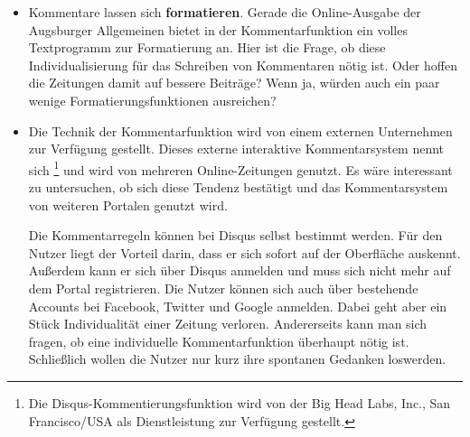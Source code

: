\begin{itemize}


\item Kommentare lassen sich {\bfseries formatieren}. Gerade die Online-Ausgabe der Augsburger Allgemeinen bietet in der Kommentarfunktion ein volles Textprogramm zur Formatierung an.  Hier ist die Frage, ob diese Individualisierung für das Schreiben von  Kommentaren nötig ist. Oder hoffen die Zeitungen damit auf bessere Beiträge? Wenn ja, würden auch ein paar wenige Formatierungsfunktionen ausreichen? \\

\item Die Technik der Kommentarfunktion wird von einem externen Unternehmen zur Verfügung gestellt. Dieses externe interaktive
Kommentarsystem nennt sich \grqq\footnote{Die Disqus-Kommentierungsfunktion wird von der Big Head Labs, Inc., San Francisco/USA als Dienstleistung zur Verfügung gestellt.} und wird von mehreren Online-Zeitungen genutzt. Es wäre interessant zu untersuchen, ob sich diese Tendenz bestätigt und das Kommentarsystem von weiteren Portalen genutzt wird. 

Die Kommentarregeln können bei Disqus selbst bestimmt werden. Für den Nutzer liegt der Vorteil darin, dass er sich sofort auf der Oberfläche auskennt. Außerdem kann er sich über Disqus anmelden und muss sich nicht mehr auf dem Portal registrieren. Die Nutzer können sich auch über bestehende Accounts bei Facebook, Twitter und Google anmelden. Dabei geht aber ein Stück Individualität einer Zeitung verloren. Andererseits kann man sich fragen, ob eine individuelle Kommentarfunktion überhaupt nötig ist. Schließlich wollen die Nutzer nur kurz ihre spontanen Gedanken loswerden. \\






\end{itemize}
